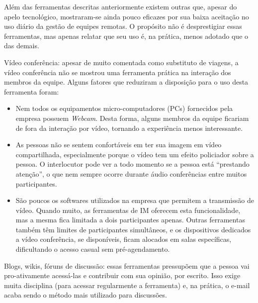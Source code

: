 \documentclass[12pt]{article} %
\begin{document}
Além das ferramentas descritas anteriormente existem outras que, apesar do apelo tecnológico, mostraram-se ainda 
pouco eficazes por sua baixa aceitação no uso diário da gestão de equipes remotas. 
O propósito não é desprestigiar essas ferramentas, mas apenas relatar que seu uso é, na prática,
menos adotado que o das demais.

\begin{description}

\item{Vídeo conferência:} apesar de muito comentada como substituto de viagens, a vídeo conferência não se mostrou uma
    ferramenta prática na interação dos membros da equipe. Alguns fatores que reduziram a disposição
    para o uso desta ferramenta foram:
    \begin{itemize}

    \item Nem todos os equipamentos micro-computadores (PCs) fornecidos pela empresa possuem \textit{Webcam}. Desta forma, alguns membros da equipe ficariam de fora da interação por vídeo, tornando
       a experiência menos interessante.

    \item As pessoas não se sentem confortáveis em ter sua imagem em vídeo compartilhada, especialmente
       porque o vídeo tem um efeito policiador sobre a pessoa. O interlocutor pode ver a todo momento 
       se a pessoa está ``prestando atenção'', o que nem sempre ocorre durante áudio conferências entre muitos participantes.

    \item São poucos os softwares utilizados na empresa que permitem a transmissão de vídeo. Quando muito, as ferramentas de IM
       oferecem esta funcionalidade, mas a mesma fica limitada a dois participantes apenas. Outras ferramentas também têm 
	limites de participantes simultâneos, e os dispositivos dedicados a vídeo conferência, se disponíveis, ficam alocados em salas 	
	específicas, dificultando o acesso casual sem pré-agendamento.
    \end{itemize}

\item{Blogs, wikis, fóruns de discussão:} essas ferramentas pressupõem que a pessoa vai pro-ativamente acessá-las e contribuir 
	com sua opinião, por escrito. Isso exige muita disciplina (para acessar regularmente a ferramenta) e, na prática, o e-mail acaba
	sendo o método mais utilizado para discussões.

\end{description}
\end{document}
